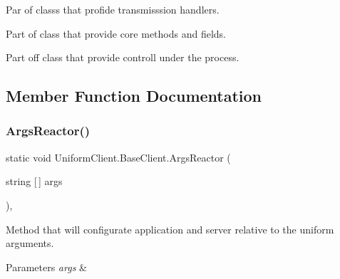 Par of classs that profide transmisssion handlers. 

Part of class that provide core methods and fields. 

Part off class that provide controll under the process. 

\subsection{Member Function Documentation}
\mbox{\label{class_uniform_client_1_1_base_client_a7ec48981cf3e7ec10d2cb7dff81f912a}} 
\subsubsection{\texorpdfstring{Args\+Reactor()}{ArgsReactor()}}
{\footnotesize\ttfamily static void Uniform\+Client.\+Base\+Client.\+Args\+Reactor (\begin{DoxyParamCaption}\item[{string \mbox{[}$\,$\mbox{]}}]{args }\end{DoxyParamCaption})\hspace{0.3cm}{\ttfamily [static]}, {\ttfamily [protected]}}



Method that will configurate application and server relative to the uniform arguments. 


\begin{DoxyParams}{Parameters}
{\em args} & \\
\hline
\end{DoxyParams}
\mbox{\label{class_uniform_client_1_1_base_client_a964bd521f46fd99f64b10257c5d233ef}} 
